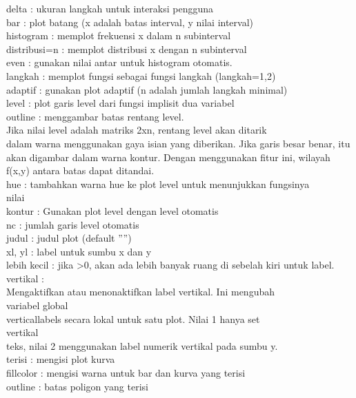 \documentclass[a4paper,10pt]{article}
\begin{document}
\begin{eulernotebook}
\begin{eulercomment}
\begin{eulercomment}
\begin{eulercomment}
\begin{eulercomment}
\begin{eulercomment}
\begin{eulercomment}
\begin{eulercomment}
\begin{eulercomment}
\begin{eulercomment}
\begin{eulercomment}
\begin{eulercomment}
delta : ukuran langkah untuk interaksi pengguna\\
bar : plot batang (x adalah batas interval, y nilai interval)\\
histogram : memplot frekuensi x dalam n subinterval\\
distribusi=n : memplot distribusi x dengan n subinterval\\
even : gunakan nilai antar untuk histogram otomatis.\\
langkah : memplot fungsi sebagai fungsi langkah (langkah=1,2)\\
adaptif : gunakan plot adaptif (n adalah jumlah langkah minimal)\\
level : plot garis level dari fungsi implisit dua variabel\\
outline : menggambar batas rentang level.\\
Jika nilai level adalah matriks 2xn, rentang level akan ditarik\\
dalam warna menggunakan gaya isian yang diberikan. Jika garis besar
benar, itu\\
akan digambar dalam warna kontur. Dengan menggunakan fitur ini,
wilayah\\
f(x,y) antara batas dapat ditandai.\\
hue : tambahkan warna hue ke plot level untuk menunjukkan fungsinya\\
nilai\\
kontur : Gunakan plot level dengan level otomatis\\
nc : jumlah garis level otomatis\\
judul : judul plot (default ””)\\
xl, yl : label untuk sumbu x dan y\\
lebih kecil : jika \textgreater{}0, akan ada lebih banyak ruang di sebelah kiri
untuk label.\\
vertikal :\\
Mengaktifkan atau menonaktifkan label vertikal. Ini mengubah\\
variabel global\\
verticallabels secara lokal untuk satu plot. Nilai 1 hanya set\\
vertikal\\
teks, nilai 2 menggunakan label numerik vertikal pada sumbu y.\\
terisi : mengisi plot kurva\\
fillcolor : mengisi warna untuk bar dan kurva yang terisi\\
outline : batas poligon yang terisi\\

\end{eulercomment}
\end{eulercomment}
\end{eulercomment}
\end{eulercomment}
\end{eulercomment}
\end{eulercomment}
\end{eulercomment}
\end{eulercomment}
\end{eulercomment}
\end{eulercomment}
\end{eulercomment}
\end{eulernotebook}
\end{document}
